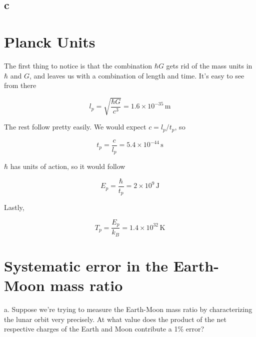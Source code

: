 \documentclass[12pt]{article}
\begin{document}
\subsection*{c}

\section{Planck Units}

The first thing to notice is that the combination \(\hbar G\) gets rid of the mass units in \(\hbar\) and \(G\), and leaves us with a combination of length and time. It's easy to see from there 

\[ l_p = \sqrt{\frac{\hbar G}{c^3}} = 1.6 \times 10^{-35} \,\mathrm{m}
\]

The rest follow pretty easily. We would expect \(c = l_p/t_p\), so 

\[ t_p = \frac{c}{l_p} = 5.4 \times 10^{-44} \, \mathrm{s}
\]

\(\hbar\) has units of action, so it would follow

\[ E_p = \frac{\hbar}{t_p} = 2 \times 10^9 \,\mathrm{J}
\]

Lastly, 

\[ T_p = \frac{E_p}{k_B} = 1.4 \times 10^{32}\,\mathrm{K}
\]


\section{Systematic error in the Earth-Moon mass ratio}

a. Suppose we're trying to measure the Earth-Moon mass ratio by characterizing the lunar orbit very precisely. At what value does the product of the net respective charges of the Earth and Moon contribute a 1\% error?
\end{document}
